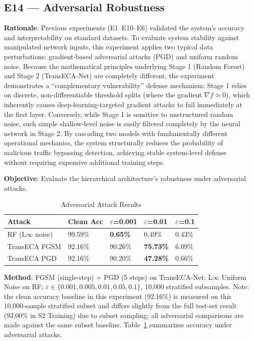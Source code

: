\documentclass[sigconf]{acmart}
\begin{document}
\subsection{E14 --- Adversarial Robustness}
\textbf{Rationale}: Previous experiments (E1--E10--E6) validated the system's accuracy and interpretability on standard datasets. To evaluate system stability against manipulated network inputs, this experiment applies two typical data perturbations: gradient-based adversarial attacks (PGD) and uniform random noise. Because the mathematical principles underlying Stage 1 (Random Forest) and Stage 2 (TransECA-Net) are completely different, the experiment demonstrates a ``complementary vulnerability'' defense mechanism: Stage 1 relies on discrete, non-differentiable threshold splits (where the gradient $\nabla f \simeq 0$), which inherently causes deep-learning-targeted gradient attacks to fail immediately at the first layer. Conversely, while Stage 1 is sensitive to unstructured random noise, such simple shallow-level noise is easily filtered completely by the neural network in Stage 2. By cascading two models with fundamentally different operational mechanics, the system structurally reduces the probability of malicious traffic bypassing detection, achieving stable system-level defense without requiring expensive additional training steps.

\textbf{Objective}: Evaluate the hierarchical architecture's robustness under adversarial attacks.


\begin{table}[!t]
\caption{Adversarial Attack Results}
\label{tab:adversarial}
\begin{tabular}{lllll}
\toprule
\textbf{Attack} & \textbf{Clean Acc} & \textbf{$\varepsilon$=0.001} & \textbf{$\varepsilon$=0.01} & \textbf{$\varepsilon$=0.1} \\
\midrule
RF (L$\infty$ noise) & 99.59\% & \textbf{0.65\%} & 0.49\% & 0.43\% \\
TransECA FGSM & 92.16\% & 90.26\% & \textbf{75.73\%} & 6.09\% \\
TransECA PGD & 92.16\% & 90.20\% & \textbf{47.28\%} & 0.66\% \\
\bottomrule
\end{tabular}
\end{table}

\textbf{Method}: FGSM \cite{14} (single-step) + PGD \cite{17} (5 steps) on TransECA-Net; L$\infty$ Uniform Noise on RF; $\varepsilon \in \{0.001, 0.005, 0.01, 0.05, 0.1\}$, 10,000 stratified subsamples. Note: the clean accuracy baseline in this experiment (92.16\%) is measured on this 10,000-sample stratified subset and differs slightly from the full test-set result (93.00\% in S2 Training) due to subset sampling; all adversarial comparisons are made against the same subset baseline. Table~\ref{tab:adversarial} summarizes accuracy under adversarial attacks.
\end{document}
